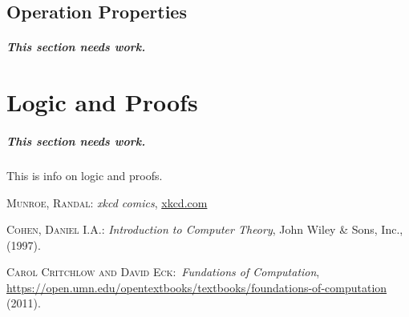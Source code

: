 \documentclass[letterpaper,12pt,openany,reqno]{book}%
\newcommand{\needswork}{\paragraph{This section needs work.}}
\begin{document}
\section{Operation Properties}
\needswork

\chapter{Logic and Proofs}
\needswork
This is info on logic and proofs.

\begin{thebibliography}{9}
 \textsc{Munroe, Randal}: \textit{xkcd comics}, \url{xkcd.com}

 \textsc{Cohen, Daniel I.A.}: \textit{Introduction to Computer Theory}, John Wiley \& Sons, Inc., (1997).

 \textsc{Carol Critchlow and David Eck}:\ \textit{Fundations of Computation}, \url{https://open.umn.edu/opentextbooks/textbooks/foundations-of-computation} (2011).
\end{thebibliography}
\end{document}
